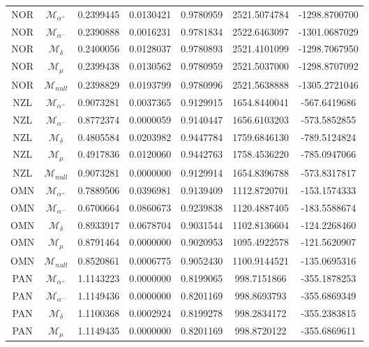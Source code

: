 \begin{tabular}{ccccccc}
NOR & $\mathcal{M}_{\alpha^+}$ & 0.2399445 & 0.0130421 & 0.9780959 & 2521.5074784 & -1298.8700700\\
NOR & $\mathcal{M}_{\alpha^-}$ & 0.2390888 & 0.0016231 & 0.9781834 & 2522.6463097 & -1301.0687029\\
NOR & $\mathcal{M}_{\delta}$ & 0.2400056 & 0.0128037 & 0.9780893 & 2521.4101099 & -1298.7067950\\
NOR & $\mathcal{M}_{\mu}$ & 0.2399438 & 0.0130562 & 0.9780959 & 2521.5037000 & -1298.8707092\\
NOR & $\mathcal{M}_{null}$ & 0.2398829 & 0.0193799 & 0.9780996 & 2521.5638888 & -1305.2721046\\
NZL & $\mathcal{M}_{\alpha^+}$ & 0.9073281 & 0.0037365 & 0.9129915 & 1654.8440041 & -567.6419686\\
NZL & $\mathcal{M}_{\alpha^-}$ & 0.8772374 & 0.0000059 & 0.9140447 & 1656.6103203 & -573.5852855\\
NZL & $\mathcal{M}_{\delta}$ & 0.4805584 & 0.0203982 & 0.9447784 & 1759.6846130 & -789.5124824\\
NZL & $\mathcal{M}_{\mu}$ & 0.4917836 & 0.0120060 & 0.9442763 & 1758.4536220 & -785.0947066\\
NZL & $\mathcal{M}_{null}$ & 0.9073281 & 0.0000000 & 0.9129914 & 1654.8396788 & -573.8317817\\
OMN & $\mathcal{M}_{\alpha^+}$ & 0.7889506 & 0.0396981 & 0.9139409 & 1112.8720701 & -153.1574333\\
OMN & $\mathcal{M}_{\alpha^-}$ & 0.6700664 & 0.0860673 & 0.9239838 & 1120.4887405 & -183.5588674\\
OMN & $\mathcal{M}_{\delta}$ & 0.8933917 & 0.0678704 & 0.9031544 & 1102.8136604 & -124.2268460\\
OMN & $\mathcal{M}_{\mu}$ & 0.8791464 & 0.0000000 & 0.9020953 & 1095.4922578 & -121.5620907\\
OMN & $\mathcal{M}_{null}$ & 0.8520861 & 0.0006775 & 0.9052430 & 1100.9144521 & -135.0695316\\
PAN & $\mathcal{M}_{\alpha^+}$ & 1.1143223 & 0.0000000 & 0.8199065 & 998.7151866 & -355.1878253\\
PAN & $\mathcal{M}_{\alpha^-}$ & 1.1149436 & 0.0000000 & 0.8201169 & 998.8693793 & -355.6869349\\
PAN & $\mathcal{M}_{\delta}$ & 1.1100368 & 0.0002924 & 0.8199278 & 998.2834172 & -355.2383815\\
PAN & $\mathcal{M}_{\mu}$ & 1.1149435 & 0.0000000 & 0.8201169 & 998.8720122 & -355.6869611\\

\end{tabular}
